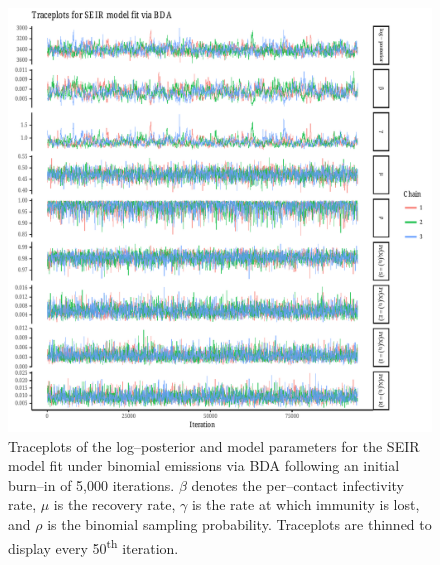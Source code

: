\begin{figure}[htbp]
	\centering
	\includegraphics[width=\linewidth]{figures/bbs_seir_bda_traceplots.pdf}
	\caption{Traceplots of the log--posterior and model parameters for the SEIR model fit under binomial emissions via BDA following an initial burn--in of 5,000 iterations. $ \beta $ denotes the per--contact infectivity rate, $ \mu $ is the recovery rate, $ \gamma $ is the rate at which immunity is lost, and $ \rho $ is the binomial sampling probability. Traceplots are thinned to display every 50\textsuperscript{th} iteration.}
	\label{fig:bbs_seir_bda_traceplots}
\end{figure}

